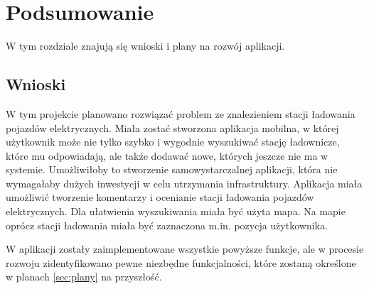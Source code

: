\chapter{Podsumowanie}
W tym rozdziale znajują się wnioski i plany na rozwój aplikacji.

\section{Wnioski}


W tym projekcie planowano rozwiązać problem ze znalezieniem stacji ładowania pojazdów elektrycznych. Miała zostać stworzona aplikacja mobilna, w której użytkownik może nie tylko szybko i wygodnie wyszukiwać stację ładownicze, które mu odpowiadają, ale także dodawać nowe, których jeszcze nie ma w systemie.
Umożliwiłoby to stworzenie samowystarczalnej aplikacji, która nie wymagałaby dużych inwestycji w celu utrzymania infrastruktury. Aplikacja miała umożliwić tworzenie komentarzy i ocenianie stacji ładowania pojazdów elektrycznych. Dla ułatwienia wyszukiwania miała być użyta mapa.
Na mapie oprócz stacji ładowania miała być zaznaczona m.in. pozycja użytkownika.

W aplikacji zostały zaimplementowane wszystkie powyższe funkcje, ale w procesie rozwoju zidentyfikowano pewne niezbędne funkcjalności, które zostaną określone w planach \ref{sec:plany} na przyszłość.

